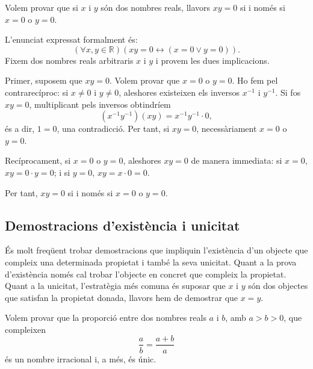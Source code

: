 \begin{exemple}
Volem provar que si $x$ i $y$ són dos nombres reals, llavors $xy=0$ si i
només si $x=0$ o $y=0$.
\end{exemple}

\begin{solucio}
L'enunciat expressat formalment és:
\begin{equation*}
\left( \forall x,y\in\mathbb{R}\right) \left( xy=0\longleftrightarrow
(x=0\vee y=0)\right).
\end{equation*}
Fixem dos nombres reals arbitraris $x$ i $y$ i provem les dues implicacions.

Primer, suposem que $xy=0$. Volem provar que $x=0$ o $y=0$. Ho fem pel
contrarecíproc: si $x\neq0$ i $y\neq0$, aleshores existeixen els inversos
$x^{-1}$ i $y^{-1}$. Si fos $xy=0$, multiplicant pels inversos obtindríem
\[
(x^{-1}y^{-1})(xy)=x^{-1}y^{-1}\cdot0,
\]
és a dir, $1=0$, una contradicció. Per tant, si $xy=0$, necessàriament
$x=0$ o $y=0$.

Recíprocament, si $x=0$ o $y=0$, aleshores $xy=0$ de manera immediata: si
$x=0$, $xy=0\cdot y=0$; i si $y=0$, $xy=x\cdot0=0$.

Per tant, $xy=0$ si i només si $x=0$ o $y=0$.
\end{solucio}

\subsection{Demostracions d'existència i unicitat}

És molt freqüent trobar demostracions que impliquin l'existència
d'un objecte que compleix una determinada propietat i també la seva
unicitat. Quant a la prova d'existència només cal trobar l'objecte
en concret que compleix la propietat. Quant a la unicitat, l'estratègia més comuna és suposar que $x$ i $y$ són dos objectes que satisfan
la propietat donada, llavors hem de demostrar que $x=y$.

\begin{exemple}
Volem provar que la proporció entre dos nombres reals $a$ i $b$, amb
$a>b>0$, que compleixen
\begin{equation*}
\frac{a}{b}=\frac{a+b}{a}
\end{equation*}
és un nombre irracional i, a més, és únic.
\end{exemple}

